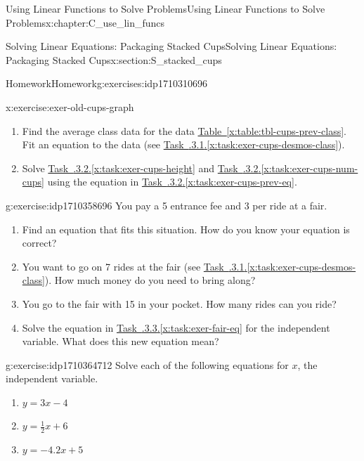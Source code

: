 \documentclass[oneside,10pt,]{book}
\newcommand{\xreffont}{\relax}
\numberwithin{equation}{chapter}
\begin{document}
\begin{chapterptx}{Using Linear Functions to Solve Problems}{}{Using Linear Functions to Solve Problems}{}{}{x:chapter:C_use_lin_funcs}
\begin{sectionptx}{Solving Linear Equations: Packaging Stacked Cups}{}{Solving Linear Equations: Packaging Stacked Cups}{}{}{x:section:S_stacked_cups}
\begin{exercises-subsection}{Homework}{}{Homework}{}{}{g:exercises:idp1710310696}
\begin{divisionexercise}{2}{}{}{x:exercise:exer-old-cups-graph}
\begin{enumerate}[font=\bfseries,label=(\alph*),ref=\alph*]
\item\label{x:task:exer-cups-prev-eq}Find the average class data for the data \hyperref[x:table:tbl-cups-prev-class]{Table~{\xreffont\ref{x:table:tbl-cups-prev-class}}}. Fit an equation to the data (see \hyperref[x:task:exer-cups-desmos-class]{Task~{\xreffont 3.2.3.1}.{\xreffont\ref{x:task:exer-cups-desmos-class}}}).%
\item{}Solve \hyperref[x:task:exer-cups-height]{Task~{\xreffont 3.2.3.2}.{\xreffont\ref{x:task:exer-cups-height}}} and \hyperref[x:task:exer-cups-num-cups]{Task~{\xreffont 3.2.3.2}.{\xreffont\ref{x:task:exer-cups-num-cups}}} using the equation in \hyperref[x:task:exer-cups-prev-eq]{Task~{\xreffont 3.2.3.2}.{\xreffont\ref{x:task:exer-cups-prev-eq}}}.%
\end{enumerate}
\end{divisionexercise}%
\begin{divisionexercise}{3}{}{}{g:exercise:idp1710358696}%
You pay a \textdollar{}5 entrance fee and \textdollar{}3 per ride at a fair.%
\begin{enumerate}[font=\bfseries,label=(\alph*),ref=\alph*]
\item\label{x:task:exer-fair-eq}Find an equation that fits this situation. How do you know your equation is correct?%
\item{}You want to go on 7 rides at the fair (see \hyperref[x:task:exer-cups-desmos-class]{Task~{\xreffont 3.2.3.1}.{\xreffont\ref{x:task:exer-cups-desmos-class}}}). How much money do you need to bring along?%
\item{}You go to the fair with \textdollar{}15 in your pocket. How many rides can you ride?%
\item{}Solve the equation in \hyperref[x:task:exer-fair-eq]{Task~{\xreffont 3.2.3.3}.{\xreffont\ref{x:task:exer-fair-eq}}} for the independent variable. What does this new equation mean?%
\end{enumerate}
\end{divisionexercise}%
\begin{divisionexercise}{4}{}{}{g:exercise:idp1710364712}%
Solve each of the following equations for \(x\), the independent variable.%
\begin{enumerate}[font=\bfseries,label=(\alph*),ref=\alph*]
\item{}\(y = 3x - 4\)%
\item{}\(y = \frac{1}{2}x + 6\)%
\item{}\(y = -4.2x + 5\)%
\end{enumerate}
\end{divisionexercise}%

\end{exercises-subsection}
\end{sectionptx}
\end{chapterptx}
\end{document}
